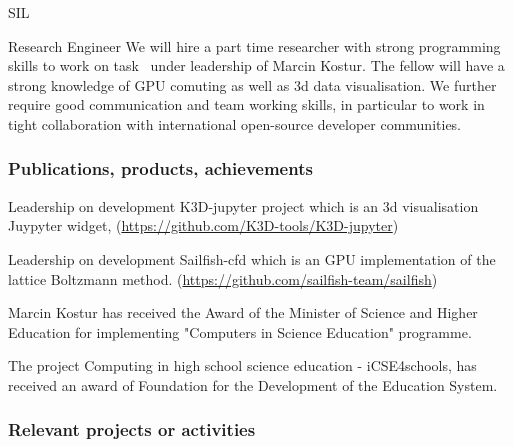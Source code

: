 \begin{sitedescription}{SIL}



\begin{participant}[type=R,PM=16,salary=2500]{Research Engineer}
    We will hire a part time researcher with strong programming skills to work on task~ under leadership of Marcin Kostur. 
The fellow will have a strong knowledge of GPU comuting as well as 3d data visualisation. 
We further require good communication and team working skills, in particular to work in tight collaboration with international open-source developer communities.
\end{participant}

\subsubsection*{Publications, products, achievements}

\begin{compactenum}
\item Leadership on development K3D-jupyter project which is an 3d visualisation Juypyter widget, (\url{https://github.com/K3D-tools/K3D-jupyter})
\item Leadership on development Sailfish-cfd which is an GPU implementation of the lattice Boltzmann method. (\url{https://github.com/sailfish-team/sailfish})\cite{januszewski2014sailfish}
\item Marcin Kostur has received the Award of the Minister of Science and Higher Education for implementing "Computers in Science Education" programme.
\item The project  Computing in high school science education - iCSE4schools, has received an award of Foundation for the Development of the Education System.


\end{compactenum}

\subsubsection*{Relevant projects or activities}


\end{sitedescription}
